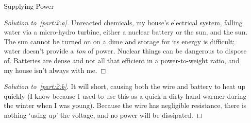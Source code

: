 \documentclass[10pt, physics]{homework}
\begin{document}
	\begin{problem}
		Supplying Power
	\end{problem}
	\begin{proof}[Solution to~\ref{part:2:a}]
		Unreacted chemicals, my house's electrical system, falling water via a micro-hydro turbine, either a nuclear battery or the sun, and the sun. The sun cannot be turned on on a dime and storage for its energy is difficult; water doesn't provide a \emph{ton} of power. Nuclear things can be dangerous to dispose of. Batteries are dense and not all that efficient in a power-to-weight ratio, and my house isn't always with me.
	\end{proof}
	\begin{proof}[Solution to~\ref{part:2:b}]
		It will short, causing both the wire and battery to heat up quickly (I know because I used to use this as a quick-n-dirty hand warmer during the winter when I was young). Because the wire has negligible resistance, there is nothing `using up' the voltage, and no power will be dissipated.
	\end{proof}
\end{document}
